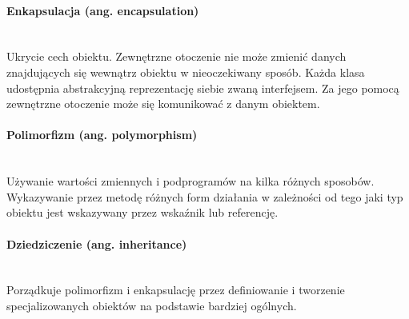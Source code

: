 \documentclass{article}
\numberwithin{equation}{section}
\begin{document}
\paragraph{Enkapsulacja (ang. encapsulation)}\mbox{}\\ Ukrycie cech obiektu. Zewnętrzne otoczenie nie może zmienić danych znajdujących się wewnątrz obiektu w nieoczekiwany sposób. Każda klasa udostępnia abstrakcyjną reprezentację siebie zwaną interfejsem. Za jego pomocą zewnętrzne otoczenie może się komunikować z danym obiektem.
\paragraph{Polimorfizm (ang. polymorphism)}\mbox{}\\ Używanie wartości zmiennych i podprogramów na kilka różnych sposobów. Wykazywanie przez metodę różnych form działania w zależności od tego jaki typ obiektu jest wskazywany przez wskaźnik lub referencję.
\paragraph{Dziedziczenie (ang. inheritance)}\mbox{}\\ Porządkuje polimorfizm i enkapsulację przez definiowanie i tworzenie specjalizowanych obiektów na podstawie bardziej ogólnych.
\end{document}
